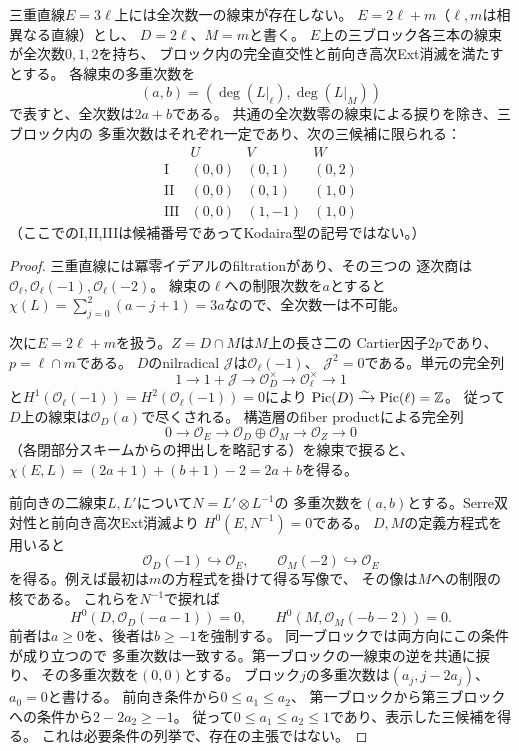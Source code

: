 \begin{proposition}[三重直線と二重直線の多重次数]
\label{prop:ou-nonreduced-multidegrees}
三重直線$E=3\ell$上には全次数一の線束が存在しない。
$E=2\ell+m$（$\ell,m$は相異なる直線）とし、
$D=2\ell$、$M=m$と書く。
$E$上の三ブロック各三本の線束が全次数$0,1,2$を持ち、
ブロック内の完全直交性と前向き高次Ext消滅を満たすとする。
各線束の多重次数を
\[
 (a,b)=(\deg(L|_\ell),\deg(L|_M))
\]
で表すと、全次数は$2a+b$である。
共通の全次数零の線束による捩りを除き、三ブロック内の
多重次数はそれぞれ一定であり、次の三候補に限られる：
\[
\begin{array}{c|ccc}
 & U&V&W\\ \hline
 \mathrm{I}&(0,0)&(0,1)&(0,2)\\
 \mathrm{II}&(0,0)&(0,1)&(1,0)\\
 \mathrm{III}&(0,0)&(1,-1)&(1,0)
\end{array}
\]
（ここでのI,II,IIIは候補番号であってKodaira型の記号ではない。）
\end{proposition}
\begin{proof}
三重直線には冪零イデアルのfiltrationがあり、その三つの
逐次商は$\mathcal O_\ell,\mathcal O_\ell(-1),\mathcal O_\ell(-2)$。
線束の$\ell$への制限次数を$a$とすると
$\chi(L)=\sum_{j=0}^2(a-j+1)=3a$なので、全次数一は不可能。

次に$E=2\ell+m$を扱う。$Z=D\cap M$は$M$上の長さ二の
Cartier因子$2p$であり、$p=\ell\cap m$である。
$D$のnilradical $\mathcal J$は$\mathcal O_\ell(-1)$、
$\mathcal J^2=0$である。単元の完全列
\[
 1\to 1+\mathcal J\to\mathcal O_D^\times
 \to\mathcal O_\ell^\times\to1
\]
と$H^1(\mathcal O_\ell(-1))=H^2(\mathcal O_\ell(-1))=0$により
$\operatorname{Pic}(D)\xrightarrow{\sim}\operatorname{Pic}(\ell)=\mathbb Z$。
従って$D$上の線束は$\mathcal O_D(a)$で尽くされる。
構造層のfiber productによる完全列
\begin{equation}\label{eq:ou-double-line-union}
 0\to\mathcal O_E\to\mathcal O_D\oplus\mathcal O_M
 \to\mathcal O_Z\to0
\end{equation}
（各閉部分スキームからの押出しを略記する）を線束で捩ると、
$\chi(E,L)=(2a+1)+(b+1)-2=2a+b$を得る。

前向きの二線束$L,L'$について$N=L'\otimes L^{-1}$の
多重次数を$(a,b)$とする。Serre双対性と前向き高次Ext消滅より
$H^0(E,N^{-1})=0$である。
$D,M$の定義方程式を用いると
\[
 \mathcal O_D(-1)\hookrightarrow\mathcal O_E,\qquad
 \mathcal O_M(-2)\hookrightarrow\mathcal O_E
\]
を得る。例えば最初は$m$の方程式を掛けて得る写像で、
その像は$M$への制限の核である。
これらを$N^{-1}$で捩れば
\[
 H^0(D,\mathcal O_D(-a-1))=0,\qquad
 H^0(M,\mathcal O_M(-b-2))=0.
\]
前者は$a\geq0$を、後者は$b\geq-1$を強制する。
同一ブロックでは両方向にこの条件が成り立つので
多重次数は一致する。第一ブロックの一線束の逆を共通に捩り、
その多重次数を$(0,0)$とする。
ブロック$j$の多重次数は$(a_j,j-2a_j)$、$a_0=0$と書ける。
前向き条件から$0\leq a_1\leq a_2$、
第一ブロックから第三ブロックへの条件から$2-2a_2\geq-1$。
従って$0\leq a_1\leq a_2\leq1$であり、表示した三候補を得る。
これは必要条件の列挙で、存在の主張ではない。
\end{proof}

